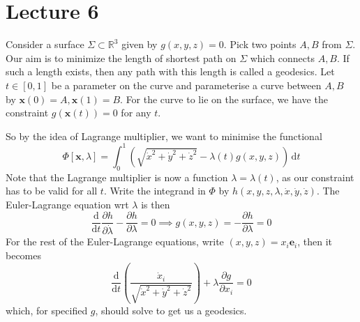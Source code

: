 \documentclass{article}
\begin{document}
\part*{Lecture 6}
\begin{example}
    Consider a surface $\Sigma\subset\mathbb R^3$ given by $g(x,y,z)=0$.
    Pick two points $A,B$ from $\Sigma$.
    Our aim is to minimize the length of shortest path on $\Sigma$ which connects $A,B$.
    If such a length exists, then any path with this length is called a geodesics.
    Let $t\in[0,1]$ be a parameter on the curve and parameterise a curve between $A,B$ by $\mathbf{x}(0)=A,\mathbf{x}(1)=B$.
    For the curve to lie on the surface, we have the constraint $g(\mathbf{x}(t))=0$ for any $t$.

    So by the idea of Lagrange multiplier, we want to minimise the functional
    $$\Phi[\mathbf{x},\lambda]=\int_0^1\left( \sqrt{\dot{x}^2+\dot{y}^2+\dot{z}^2} -\lambda(t) g(x,y,z)\right)\,\mathrm dt$$
    Note that the Lagrange multiplier is now a function $\lambda=\lambda(t)$, as our constraint has to be valid for all $t$.
    Write the integrand in $\Phi$ by $h(x,y,z,\lambda,\dot{x},\dot{y},\dot{z})$.
    The Euler-Lagrange equation wrt $\lambda$ is then
    $$\frac{\mathrm d}{\mathrm dt}\frac{\partial h}{\partial \dot{\lambda}}-\frac{\partial h}{\partial\lambda}=0\implies g(x,y,z)=-\frac{\partial h}{\partial\lambda}=0$$
    For the rest of the Euler-Lagrange equations, write $(x,y,z)=x_i\mathbf{e}_i$, then it becomes
    $$\frac{\mathrm d}{\mathrm dt}\left( \frac{\dot{x}_i}{\sqrt{\dot{x}^2+\dot{y}^2+\dot{z}^2}} \right)+\lambda\frac{\partial g}{\partial x_i}=0$$
    which, for specified $g$, should solve to get us a geodesics.
\end{example}
\end{document}
